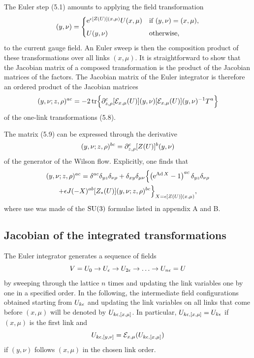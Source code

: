 The Euler step (5.1) amounts to applying the field transformation
\begin{equation}
  [\euler{x,\mu}(U)](y,\nu)=
  \begin{cases}
    \rme^{\eps [Z(U)](x,\mu)}U(x,\mu)
    & \text{if $(y,\nu)=(x,\mu)$,}\\[1.0ex]
    U(y,\nu) & \text{otherwise,}
  \end{cases}
\end{equation}
to the current gauge field. An Euler sweep is then the composition
product of these transformations over all links $(x,\mu)$.
It is straightforward to show that the Jacobian matrix of
a composed transformation is the product of the Jacobian matrices of
the factors. The Jacobian matrix of the
Euler integrator is therefore
an ordered product of the Jacobian matrices
\begin{equation}
  [\euler{x,\mu,*}(U)](y,\nu;z,\rho)^{ac}
  =-2\,\tr\Bigl\{\du^c_{z,\rho}[\euler{x,\mu}(U)](y,\nu)
  [\euler{x,\mu}(U)](y,\nu)^{-1}T^a\Bigr\}
\end{equation}
of the one-link transformations (5.8).

The matrix (5.9) can be expressed through the derivative
\begin{equation}
  [Z_{*}(U)](y,\nu;z,\rho)^{bc}=
  \du^c_{z,\rho}[Z(U)]^b(y,\nu)
\end{equation}
of the generator of the Wilson flow.
Explicitly, one finds that
\begin{multline}
  [\euler{x,\mu,*}(U)](y,\nu;z,\rho)^{ac}=
  \delta^{ac}\delta_{yz}\delta_{\nu\rho}
  +\delta_{xy}\delta_{\mu\nu}
  \Bigl\{\left(\rme^{\Ad X}-1\right)^{ac}\delta_{yz}\delta_{\nu\rho}\\
  +\eps J(-X)^{ab}[Z_{*}(U)](y,\nu;z,\rho)^{bc}\Bigr\}_{X=\eps[Z(U)](x,\mu)},
\end{multline}
where use was made of the $\mathrm{SU}(3)$ formulae
listed in appendix A and B.


\subsection{Jacobian of the integrated transformations}

The Euler integrator generates a sequence of fields
\begin{equation}
  V=U_0\to U_{\epsilon}\to U_{2\epsilon}\to\ldots\to U_{n\epsilon}=U
\end{equation}
by sweeping through the lattice $n$ times and
updating the link variables one by one in a specified order.
In the following, the intermediate field configurations
obtained starting from $U_{k\epsilon}$
and updating the link variables
on all links that come before $(x,\mu)$ will be denoted by
$U_{k\epsilon,[x,\mu]}$.
In particular, $U_{k\epsilon,[x,\mu]}=U_{k\epsilon}$ if $(x,\mu)$ is the first link
and
\begin{equation}
  U_{k\epsilon,[y,\nu]}=\mathcal{E}_{x,\mu}(U_{k\epsilon,[x,\mu]})
\end{equation}
if $(y,\nu)$ follows $(x,\mu)$ in the chosen link order.

